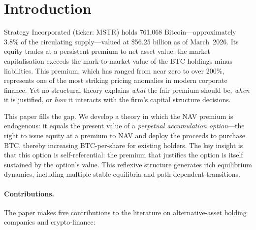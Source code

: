 
\section{Introduction}\label{sec:introduction}

Strategy Incorporated (ticker: MSTR) holds 761,068 Bitcoin---approximately
3.8\% of the circulating supply---valued at \$56.25 billion as of March~2026.
Its equity trades at a persistent premium to net asset value: the market
capitalisation exceeds the mark-to-market value of the BTC holdings minus
liabilities.  This premium, which has ranged from near zero to over 200\%,
represents one of the most striking pricing anomalies in modern corporate
finance.  Yet no structural theory explains \emph{what} the fair premium
should be, \emph{when} it is justified, or \emph{how} it interacts with the
firm's capital structure decisions.

This paper fills the gap.  We develop a theory in which the NAV premium
is endogenous: it equals the present value of a \emph{perpetual accumulation
option}---the right to issue equity at a premium to NAV and deploy the
proceeds to purchase BTC, thereby increasing BTC-per-share for existing
holders.  The key insight is that this option is self-referential: the premium
that justifies the option is itself sustained by the option's value.  This
reflexive structure generates rich equilibrium dynamics, including multiple
stable equilibria and path-dependent transitions.

\paragraph{Contributions.}
The paper makes five contributions to the literature on alternative-asset
holding companies and crypto-finance:

